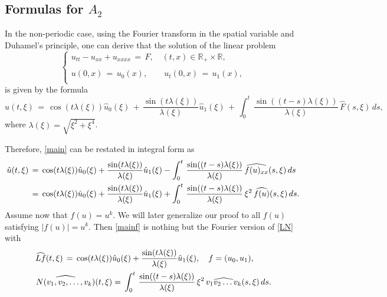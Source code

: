 \documentclass{amsart}
\begin{document}
\subsection{Formulas for $A_2$} In the non-periodic case, using the Fourier transform in the spatial variable and Duhamel's principle, one can derive that the solution of the linear problem
\begin{equation}
\left\{
\begin{array}{l}
u_{tt}-u_{xx}+u_{xxxx}\,=\,F, \quad (t,x)\in \mathbb{R}_+\times\mathbb{R},\\
\\
u(0,x)\,=\,u_0(x),\qquad u_t(0,x)\,=\,u_1(x),\\
\end{array}\right.
\label{hom}
\end{equation}
is given by the formula
\begin{equation}
\hat{u}(t,\xi)\,=\,\cos(t \lambda(\xi)) \hat{u}_0(\xi)\,+\,\frac{\sin(t \lambda(\xi))}{\lambda(\xi)} \hat{u}_1(\xi)\,+\,\int_0^t\,\frac{\sin((t-s) \lambda(\xi))}{\lambda(\xi)} \,\hat{F}(s,\xi)\,ds,
\label{lin}\end{equation}
where $\lambda(\xi)=\sqrt{\xi^2+\xi^4}$. 

Therefore, \eqref{main} can be restated in integral form as
\begin{equation}
\aligned
\hat{u}(t,\xi)\,&=\,\cos(t \lambda(\xi)) \hat{u}_0(\xi)+\frac{\sin(t \lambda(\xi))}{\lambda(\xi)} \hat{u}_1(\xi)-\int_0^t\,\frac{\sin((t-s) \lambda(\xi))}{\lambda(\xi)} \,\widehat{f(u)_{xx}}(s,\xi)\,ds\\
&=\,\cos(t \lambda(\xi)) \hat{u}_0(\xi)+\frac{\sin(t \lambda(\xi))}{\lambda(\xi)} \hat{u}_1(\xi)+\int_0^t\,\frac{\sin((t-s) \lambda(\xi))}{\lambda(\xi)}\, \xi^2\, \widehat{f(u)}(s,\xi)\,ds.\endaligned
\label{mainf}
\end{equation}
Assume now that $f(u) = u^{k}$. We will later generalize our proof to all $f(u)$ satisfying $|f(u)| = u^{k}$. Then \eqref{mainf} is
nothing but the Fourier version of \eqref{LN} with
\begin{equation}
\aligned
\widehat{Lf}(t,\xi)\,=\,\cos(t \lambda(\xi))& \hat{u}_0(\xi)+\frac{\sin(t \lambda(\xi))}{\lambda(\xi)} \hat{u}_1(\xi),\quad f=(u_0,u_1),\\
\widehat{N(v_{1},v_{2}, \dots, v_{k})}(t,\xi)&=\,\int_0^t\,\frac{\sin((t-s) \lambda(\xi))}{\lambda(\xi)}\, \xi^2\, \widehat{v_{1}  v_{2}  \dots v_{k}}(s,\xi)\,ds.\endaligned
\label{lnf}
\end{equation}
\end{document}
